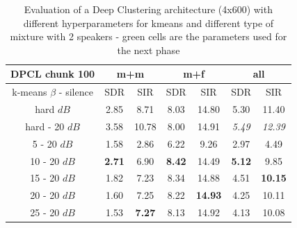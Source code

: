 \documentclass[master, tikz, final,11pt, dvipdfmx]{iscs-thesis}
\begin{document}
\begin{table}[ht]
\centering
\begin{tabular}{c|c|c|c|c|c|c}
DPCL chunk 100 & \multicolumn{2}{c|}{m+m} & \multicolumn{2}{c|}{m+f} & \multicolumn{2}{c}{all} \\ 
\hline 
k-means $\beta$ - silence & SDR & SIR & SDR & SIR & SDR & SIR \\ 
\hline 
hard $dB$ & 2.85 & 8.71 & 8.03 & 14.80 & 5.30 & 11.40 \\ 
hard - 20 $dB$ & 3.58 & 10.78 & 8.00 & 14.91 & \textit{5.49} & \textit{12.39} \\ 
\hline 
\hline 
5 - 20 $dB$ & 1.58 & 2.86 & 6.22 & 9.26 & 2.97 & 4.49 \\ 
10 - 20 $dB$ &  \cellcolor{green}\textbf{2.71} & \cellcolor{green}6.90 & \cellcolor{green}\textbf{8.42} &\cellcolor{green} 14.49 & \cellcolor{green}\textbf{5.12} & \cellcolor{green}9.85 \\ 
15 - 20 $dB$ & 1.82 & 7.23 & 8.34 & 14.88 & 4.51 & \textbf{10.15} \\ 
20 - 20 $dB$ & 1.60 & 7.25 & 8.22 & \textbf{14.93} & 4.25 & 10.11 \\ 
25 - 20 $dB$ & 1.53 & \textbf{7.27} & 8.13 & 14.92 & 4.13 & 10.08 \\ 
\end{tabular}
\captionsetup{justification=centering}
\caption{Evaluation of a Deep Clustering architecture (4x600) with different hyperparameters for kmeans and different type of mixture with 2 speakers - green cells are the parameters used for the next phase}
\label{table:DPCLV1}
\end{table}
\end{document}

